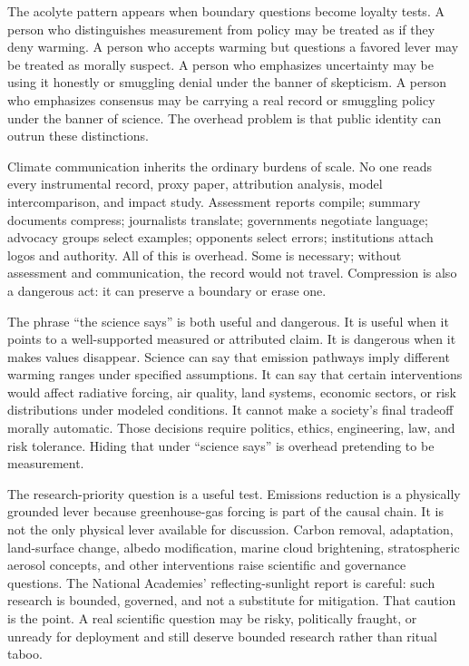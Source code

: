 The acolyte pattern appears when boundary questions become loyalty
tests. A person who distinguishes measurement from policy may be
treated as if they deny warming. A person who accepts warming but
questions a favored lever may be treated as morally suspect. A person
who emphasizes uncertainty may be using it honestly or smuggling
denial under the banner of skepticism. A person who emphasizes
consensus may be carrying a real record or smuggling policy under the
banner of science. The overhead problem is that public identity can
outrun these distinctions.

Climate communication inherits the ordinary burdens of scale. No one
reads every instrumental record, proxy paper, attribution analysis,
model intercomparison, and impact study. Assessment reports compile;
summary documents compress; journalists translate; governments
negotiate language; advocacy groups select examples; opponents select
errors; institutions attach logos and authority. All of this is
overhead. Some is necessary; without assessment and communication, the
record would not travel. Compression is also a dangerous act: it can
preserve a boundary or erase one.

The phrase ``the science says'' is both useful and dangerous. It is
useful when it points to a well-supported measured or attributed claim.
It is dangerous when it makes values disappear. Science can say that
emission pathways imply different warming ranges under specified
assumptions. It can say that certain interventions would affect
radiative forcing, air quality, land systems, economic sectors, or risk
distributions under modeled conditions. It cannot make a society's
final tradeoff morally automatic. Those decisions require politics,
ethics, engineering, law, and risk tolerance. Hiding that under ``science
says'' is overhead pretending to be measurement.

The research-priority question is a useful test. Emissions reduction is
a physically grounded lever because greenhouse-gas forcing is part of
the causal chain. It is not the only physical lever available for
discussion. Carbon removal, adaptation, land-surface change, albedo
modification, marine cloud brightening, stratospheric aerosol
concepts, and other interventions raise scientific and governance
questions. The National Academies' reflecting-sunlight report is
careful: such research is bounded, governed, and not a substitute for
mitigation. That caution is the point. A real scientific question may
be risky, politically fraught, or unready for deployment and still
deserve bounded research rather than ritual taboo.

